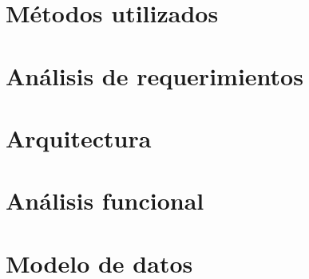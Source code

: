 \documentclass[letter,12pt]{book}
\begin{document}
  \chapter{Métodos utilizados}
  
  
  \chapter{Análisis de requerimientos}
  \label{chap:analisis_requerimientos}
    
  
  \chapter{Arquitectura}
  \label{chap:arquitectura}
    
  
  \chapter{Análisis funcional}
  \label{chap:analisis_funcional}
     
  
  \chapter{Modelo de datos}  
  \label{chap:modelo_datos}
  
  
  
  
  
  
  
  
   \appendix
   
  
\end{document}
